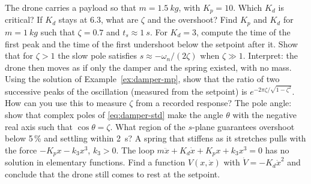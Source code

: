 \begin{exercises}
\exercise[1] The drone carries a payload so that $m = \SI{1.5}{kg}$, with $K_p = 10$. Which $K_d$ is critical? If $K_d$ stays at 6.3, what are $\zeta$ and the overshoot?
\exercise[1] Find $K_p$ and $K_d$ for $m = \SI{1}{kg}$ such that $\zeta = 0.7$ and $t_s \approx \SI{1}{s}$.
\exercise[1] For $K_d = 3$, compute the time of the first peak and the time of the first undershoot below the setpoint after it.
\exercise[2] Show that for $\zeta > 1$ the slow pole satisfies $s \approx -\omega_n/(2\zeta)$ when $\zeta \gg 1$. Interpret: the drone then moves as if only the damper and the spring existed, with no mass.
\exercise[2] Using the solution of Example~\ref{ex:damper-mp}, show that the ratio of two successive peaks of the oscillation (measured from the setpoint) is $e^{-2\pi\zeta/\sqrt{1-\zeta^2}}$. How can you use this to measure $\zeta$ from a recorded response?
\exercise[3] The pole angle: show that complex poles of \cref{eq:damper-std} make the angle $\theta$ with the negative real axis such that $\cos\theta = \zeta$. What region of the $s$-plane guarantees overshoot below 5\,\% and settling within \SI{2}{s}?
\exercise[2] A spring that stiffens as it stretches pulls with the force $-K_p x - k_3 x^3$, $k_3 > 0$. The loop $m\ddot x + K_d\dot x + K_p x + k_3 x^3 = 0$ has no solution in elementary functions. Find a function $V(x, \dot x)$ with $\dot V = -K_d\dot x^2$ and conclude that the drone still comes to rest at the setpoint.

\end{exercises}
